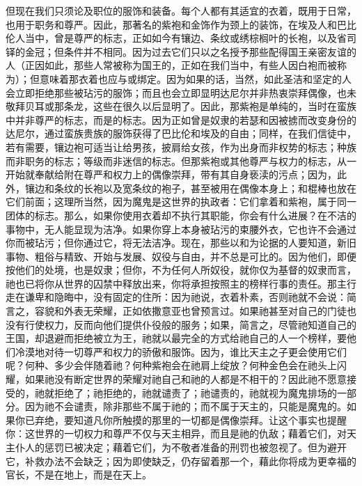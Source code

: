 但现在我们只须论及职位的服饰和装备。每个人都有其适宜的衣着，既用于日常，也用于职务和尊严。因此，那著名的紫袍和金饰作为颈上的装饰，在埃及人和巴比伦人当中，曾是尊严的标志，正如如今有镶边、条纹或绣棕榈叶的长袍，以及省司铎的金冠；但条件并不相同。因为过去它们只以之名授予那些配得国王亲密友谊的人（正因如此，那些人常被称为国王的，正如在我们当中，有些人因白袍而被称为）；但意味着那衣着也应与或绑定。因为如果的话，当然，如此圣洁和坚定的人会立即拒绝那些被玷污的服饰；而且也会立即显明达尼尔并非热衷崇拜偶像，也未敬拜贝耳或那条龙，这些在很久以后显明了。因此，那紫袍是单纯的，当时在蛮族中并非尊严的标志，而是的标志。因为正如曾是奴隶的若瑟和因被掳而改变身份的达尼尔，通过蛮族贵族的服饰获得了巴比伦和埃及的自由；同样，在我们信徒中，若有需要，镶边袍可适当让给男孩，披肩给女孩，作为出身而非权势的标志；种族而非职务的标志；等级而非迷信的标志。但那紫袍或其他尊严与权力的标志，从一开始就奉献给附在尊严和权力上的偶像崇拜，带有其自身亵渎的污点；因为，此外，镶边和条纹的长袍以及宽条纹的袍子，甚至被用在偶像本身上；和棍棒也放在它们前面；这理所当然，因为魔鬼是这世界的执政者：它们拿着和紫袍，属于同一团体的标志。那么，如果你使用衣着却不执行其职能，你会有什么进展？在不洁的事物中，无人能显现为洁净。如果你穿上本身被玷污的束腰外衣，它也许不会通过你而被玷污；但你通过它，将无法洁净。现在，那些以和为论据的人要知道，新旧事物、粗俗与精致、开始与发展、奴役与自由，并不总是可比的。因为他们，即便按他们的处境，也是奴隶；但你，不为任何人所奴役，就你仅为基督的奴隶而言，祂也已将你从世界的囚禁中释放出来，你将承担按照主的榜样行事的责任。那主行走在谦卑和隐晦中，没有固定的住所：因为祂说，衣着朴素，否则祂就不会说：简言之，容貌和外表无荣耀，正如依撒意亚也曾预言过。如果祂甚至对自己的门徒也没有行使权力，反而向他们提供仆役般的服务；如果，简言之，尽管祂知道自己的王国，却退避而拒绝被立为王，祂就以最完全的方式给祂自己的人一个榜样，要他们冷漠地对待一切尊严和权力的骄傲和服饰。因为，谁比天主之子更会使用它们呢？何种、多少会伴随着祂？何种紫袍会在祂肩上绽放？何种金色会在祂头上闪耀，如果祂没有断定世界的荣耀对祂自己和祂的人都是不相干的？因此祂不愿意接受的，祂就拒绝了；祂拒绝的，祂就谴责了；祂谴责的，祂就视为魔鬼排场的一部分。因为祂不会谴责，除非那些不属于祂的；而不属于天主的，只能是魔鬼的。如果你已弃绝，要知道凡你所触摸的那里的一切都是偶像崇拜。让这个事实也提醒你：这世界的一切权力和尊严不仅与天主相异，而且是祂的仇敌；藉着它们，对天主仆人的惩罚已被决定；藉着它们，为不敬者准备的刑罚也被忽视了。但为避开它，补救办法不会缺乏；因为即使缺乏，仍存留着那一个，藉此你将成为更幸福的官长，不是在地上，而是在天上。\par

